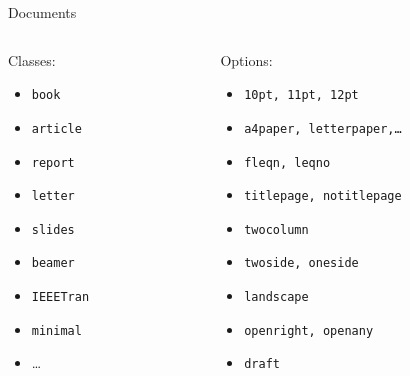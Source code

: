 \documentclass{beamer}
\begin{document}
	\begin{frame}{Documents}
    	\begin{columns}
        	\begin{column}{3cm}
              Classes:
              \begin{itemize}
                  \item \texttt{book}
                  \item \texttt{article}
                  \item \texttt{report}
                  \item \texttt{letter}
                  \item \texttt{slides}
                  \item \texttt{beamer}
                  \item \texttt{IEEETran}
                  \item \texttt{minimal}
                  \item \ldots
              \end{itemize}
        	\end{column}
            \begin{column}{7cm}
              Options:
              \begin{itemize}
                  \item \texttt{10pt, 11pt, 12pt}
                  \item \texttt{a4paper, letterpaper,\ldots}
                  \item \texttt{fleqn, leqno}
                  \item \texttt{titlepage, notitlepage}
                  \item \texttt{twocolumn}
                  \item \texttt{twoside, oneside}
                  \item \texttt{landscape}
                  \item \texttt{openright, openany}
                  \item \texttt{draft}
              \end{itemize}
        	\end{column}
    	\end{columns}
	\end{frame}
\end{document}
